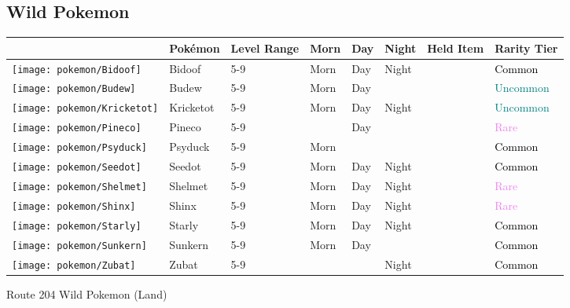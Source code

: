 \subsection{Wild Pokemon}%
\label{subsec:WildPokemon}%
\begin{longtable}{||l l l l l l l l||}%
\hline%
&Pokémon&Level Range&Morn&Day&Night&Held Item&Rarity Tier\\%
\hline%
\endhead%
\hline%
\texttt{[image: pokemon/Bidoof]}&Bidoof&5{-}9&Morn&Day&Night&&\textcolor{black}{%
Common%
}\\%
\hline%
\texttt{[image: pokemon/Budew]}&Budew&5{-}9&Morn&Day&&&\textcolor{teal}{%
Uncommon%
}\\%
\hline%
\texttt{[image: pokemon/Kricketot]}&Kricketot&5{-}9&Morn&Day&Night&&\textcolor{teal}{%
Uncommon%
}\\%
\hline%
\texttt{[image: pokemon/Pineco]}&Pineco&5{-}9&&Day&&&\textcolor{violet}{%
Rare%
}\\%
\hline%
\texttt{[image: pokemon/Psyduck]}&Psyduck&5{-}9&Morn&&&&\textcolor{black}{%
Common%
}\\%
\hline%
\texttt{[image: pokemon/Seedot]}&Seedot&5{-}9&Morn&Day&Night&&\textcolor{black}{%
Common%
}\\%
\hline%
\texttt{[image: pokemon/Shelmet]}&Shelmet&5{-}9&Morn&Day&Night&&\textcolor{violet}{%
Rare%
}\\%
\hline%
\texttt{[image: pokemon/Shinx]}&Shinx&5{-}9&Morn&Day&Night&&\textcolor{violet}{%
Rare%
}\\%
\hline%
\texttt{[image: pokemon/Starly]}&Starly&5{-}9&Morn&Day&Night&&\textcolor{black}{%
Common%
}\\%
\hline%
\texttt{[image: pokemon/Sunkern]}&Sunkern&5{-}9&Morn&Day&&&\textcolor{black}{%
Common%
}\\%
\hline%
\texttt{[image: pokemon/Zubat]}&Zubat&5{-}9&&&Night&&\textcolor{black}{%
Common%
}\\%
\hline%
\end{longtable}%
\caption{Route 204 Wild Pokemon (Land)}%

